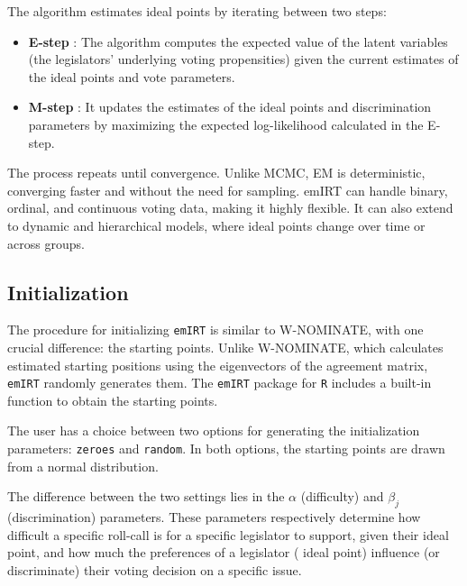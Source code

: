 \documentclass[a4paper,12pt]{report}
\begin{document}
                The algorithm estimates ideal points by
                iterating between two steps:
                \begin{itemize}
                    \item \textbf{E-step}
                    : The algorithm computes the expected value of the latent variables (the legislators' underlying
                    voting propensities) given the current estimates of the ideal points and vote parameters.
                    \item \textbf{M-step}
                    : It updates the estimates of the ideal points and discrimination parameters by maximizing the
                    expected log-likelihood calculated in the E-step.
                \end{itemize}
                The process repeats until convergence. Unlike MCMC, EM is deterministic, converging faster and without
                the need for sampling. emIRT can handle binary, ordinal, and continuous voting data, making it highly
                flexible. It can also extend to dynamic and hierarchical models, where ideal points change over
                time or across groups.

            \subsection{Initialization}

                The procedure for initializing \texttt{emIRT}
                is similar to W-NOMINATE, with one crucial difference: the starting points. Unlike W-NOMINATE, which
                calculates
                estimated starting positions using the eigenvectors of the agreement matrix, \texttt{emIRT}
                randomly generates them. The \texttt{emIRT} package for \texttt{R}
                includes a built-in function to obtain the starting points.

                The user has a choice between two options for generating the initialization parameters: \texttt{zeroes}
                and
                \texttt{random}. In both options, the starting points are drawn from a normal distribution.

                The difference between the two settings lies in the \(\alpha\) (difficulty) and \(\beta_j\)
                (discrimination) parameters. These parameters respectively determine how difficult a specific roll-call
                is for a
                specific legislator to support, given their ideal point, and how much the preferences of a legislator (
                ideal point)
                influence (or discriminate) their voting decision on a specific issue.
\end{document}
